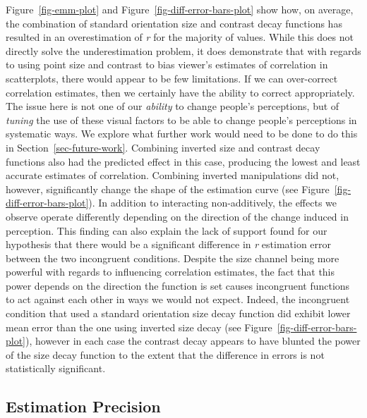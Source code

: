 \documentclass[manuscript, review, anonymous, screen]{acmart}
\begin{document}
Figure~\ref{fig-emm-plot} and Figure~\ref{fig-diff-error-bars-plot} show
how, on average, the combination of standard orientation size and
contrast decay functions has resulted in an overestimation of \emph{r}
for the majority of values. While this does not directly solve the
underestimation problem, it does demonstrate that with regards to using
point size and contrast to bias viewer's estimates of correlation in
scatterplots, there would appear to be few limitations. If we can
over-correct correlation estimates, then we certainly have the ability
to correct appropriately. The issue here is not one of our
\emph{ability} to change people's perceptions, but of \emph{tuning} the
use of these visual factors to be able to change people's perceptions in
systematic ways. We explore what further work would need to be done to
do this in Section~\ref{sec-future-work}. Combining inverted size and
contrast decay functions also had the predicted effect in this case,
producing the lowest and least accurate estimates of correlation.
Combining inverted manipulations did not, however, significantly change
the shape of the estimation curve (see
Figure~\ref{fig-diff-error-bars-plot}). In addition to interacting
non-additively, the effects we observe operate differently depending on
the direction of the change induced in perception. This finding can also
explain the lack of support found for our hypothesis that there would be
a significant difference in \emph{r} estimation error between the two
incongruent conditions. Despite the size channel being more powerful
with regards to influencing correlation estimates, the fact that this
power depends on the direction the function is set causes incongruent
functions to act against each other in ways we would not expect. Indeed,
the incongruent condition that used a standard orientation size decay
function did exhibit lower mean error than the one using inverted size
decay (see Figure~\ref{fig-diff-error-bars-plot}), however in each case
the contrast decay appears to have blunted the power of the size decay
function to the extent that the difference in errors is not
statistically significant.

\hypertarget{estimation-precision}{%
\subsection{Estimation Precision}\label{estimation-precision}}
\end{document}
